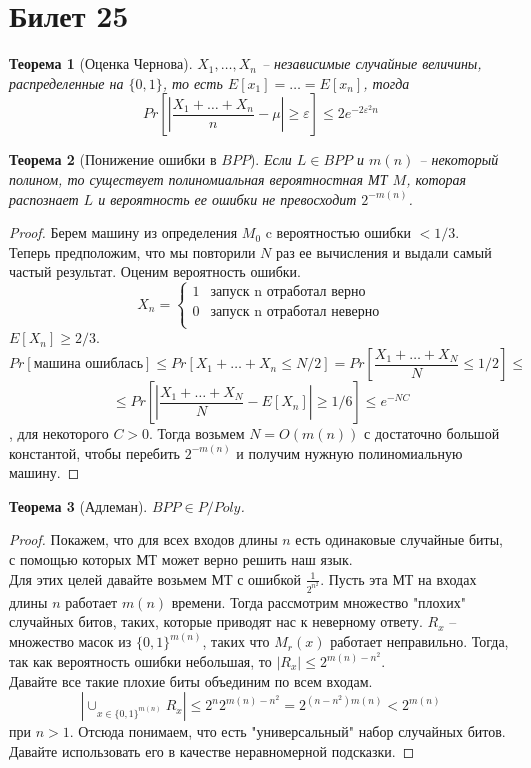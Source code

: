 \documentclass[12pt, letterpaper]{article}
\newtheorem{theorem}{Теорема}[section]
\newcommand{\e}{\varepsilon}
\begin{document}
\section{Билет 25}
\begin{theorem}[Оценка Чернова]
$X_1, \ldots, X_n$ -- независимые случайные величины, распределенные на $\{0,1\}$, то есть $E[x_1] = \ldots = E[x_n]$, тогда 
$$
Pr[|\frac{X_1+\ldots+X_n}{n} - \mu| \geq \e] \leq 2e^{-2\e^2n}
$$
\end{theorem}
\begin{theorem}[Понижение ошибки в $BPP$]
Если $L \in BPP$ и $m(n)$ -- некоторый полином, то существует полиномиальная вероятностная МТ $M$, которая распознает $L$ и вероятность ее ошибки не превосходит $2^{-m(n)}$.
\end{theorem}
\begin{proof}
Берем машину из определения $M_0$ c вероятностью ошибки $< 1/3$.\\
Теперь предположим, что мы повторили $N$ раз ее вычисления и выдали самый частый результат. Оценим вероятность ошибки. 
$$
X_n = \begin{cases}
1 & \text{запуск n отработал верно} \\
0 & \text{запуск n отработал неверно} \\
\end{cases}
$$
$E[X_n] \geq 2/3$.\\
$$
Pr[\text{машина ошиблась}] \leq Pr[X_1 + \ldots + X_n \leq N / 2] = Pr[\frac{X_1 + \ldots + X_N}{N} \leq 1/2] \leq $$ 
$$\leq Pr[|\frac{X_1+\ldots+X_N}{N} - E[X_n]| \geq 1/6] \leq e^{-NC} 
$$, для некоторого $C>0$. Тогда возьмем $N=O(m(n))$ с достаточно большой константой, чтобы перебить $2^{-m(n)}$ и получим нужную полиномиальную машину.
\end{proof}

\begin{theorem}[Адлеман]
$BPP \in P/Poly$.
\end{theorem}
\begin{proof}
Покажем, что для всех входов длины $n$ есть одинаковые случайные биты, с помощью которых МТ может верно решить наш язык. \\
Для этих целей давайте возьмем МТ с ошибкой $\frac1{2^{n^2}}$.
Пусть эта МТ на входах длины $n$ работает $m(n)$ времени. Тогда рассмотрим множество "плохих" случайных битов, таких, которые приводят нас к неверному ответу. $R_x$ -- множество масок из $\{0,1\}^{m(n)}$, таких что $M_r(x)$ работает неправильно. Тогда, так как вероятность ошибки небольшая, то $|R_x| \leq 2^{m(n)-n^2}$.\\
Давайте все такие плохие биты объединим по всем входам. $$|\cup_{x \in \{0,1\}^{m(n)}} R_x | \leq 2^{n} 2^{m(n)-n^2} = 2^{(n-n^2)m(n)} < 2^{m(n)}$$ при $n > 1$. Отсюда понимаем, что есть "универсальный" набор случайных битов. Давайте использовать его в качестве неравномерной подсказки.  
\end{proof}
\end{document}
